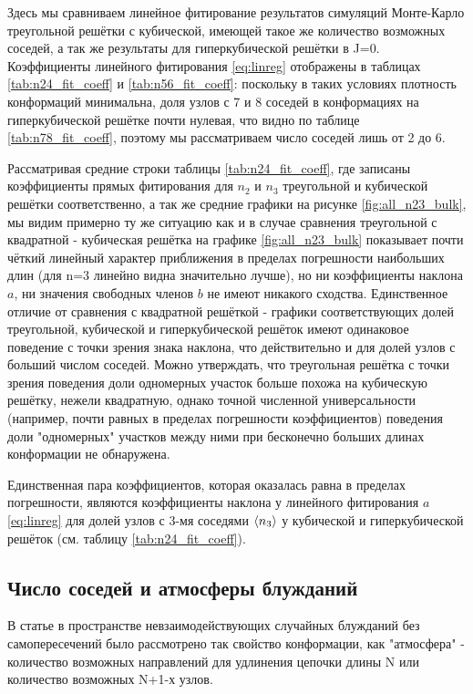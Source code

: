 Здесь мы сравниваем линейное фитирование результатов симуляций Монте-Карло треугольной решётки с кубической, имеющей такое же количество возможных соседей, а так же результаты для гиперкубической решётки в J=0. Коэффициенты линейного фитирования \eqref{eq:linreg} отображены в таблицах \ref{tab:n24_fit_coeff} и \ref{tab:n56_fit_coeff}: поскольку в таких условиях плотность конформаций минимальна, доля узлов с 7 и 8 соседей в конформациях на гиперкубической решётке почти нулевая, что видно по таблице \ref{tab:n78_fit_coeff}, поэтому мы рассматриваем число соседей лишь от 2 до 6. 

Рассматривая средние строки таблицы \ref{tab:n24_fit_coeff}, где записаны коэффициенты прямых фитирования для $n_{2}$ и $n_{3}$ треугольной и кубической решётки соответственно, а так же средние графики на рисунке \ref{fig:all_n23_bulk}, мы видим примерно ту же ситуацию как и в случае сравнения треугольной с квадратной - кубическая решётка на графике \ref{fig:all_n23_bulk} показывает почти чёткий линейный характер приближения в пределах погрешности наибольших длин (для n=3 линейно видна значительно лучше), но ни коэффициенты наклона $a$, ни значения свободных членов $b$ не имеют никакого сходства. Единственное отличие от сравнения с квадратной решёткой - графики соответствующих долей треугольной, кубической и гиперкубической решёток имеют одинаковое поведение с точки зрения знака наклона, что действительно и для долей узлов с больший числом соседей. Можно утверждать, что треугольная решётка с точки зрения поведения доли одномерных участок больше похожа на кубическую решётку, нежели квадратную, однако точной численной универсальности (например, почти равных в пределах погрешности коэффициентов) поведения доли "одномерных" участков между ними при бесконечно больших длинах конформации не обнаружена.

Единственная пара коэффициентов, которая оказалась равна в пределах погрешности, являются коэффициенты наклона у линейного фитирования $a$ \eqref{eq:linreg} для долей узлов с 3-мя соседями $\langle n_{3} \rangle$ у кубической и гиперкубической решёток (см. таблицу \ref{tab:n24_fit_coeff}).


\subsection{Число соседей и атмосферы блужданий}
\label{sec:Prellberg}

В статье \cite{owczarek2008scaling} в пространстве невзаимодействующих случайных блужданий без самопересечений было рассмотрено так свойство конформации, как "атмосфера" - количество возможных направлений для удлинения цепочки длины N или количество возможных N+1-х узлов.

